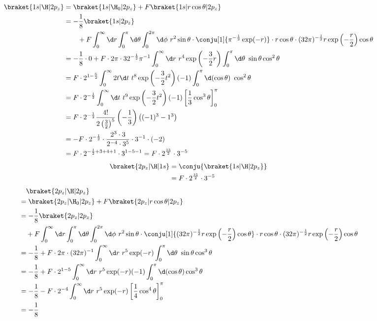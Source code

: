 \begin{align}
	\braket{1s|\H|2p_z}
&=
	\braket{1s|\H_0|2p_z}
	+
	F
		\braket{1s|r\cos\theta|2p_z} \\
%
%
&=
	-
	\frac{1}{8} \braket{1s|2p_z} \nonumber\\&\qquad
	+
	F
		\int_0^\infty \d r  \int_0^\pi \d\theta  \int_0^{2\pi} \d\phi\
			r^2\sin\theta \cdot
			\conju[1]{\pi^{-\frac{1}{2}}\exp(-r)} \cdot
			r\cos\theta \cdot
			(32\pi)^{-\frac{1}{2}} r\exp\left(-\frac{r}{2}\right)\cos\theta \\
%
%
&=
	-
	\frac{1}{8} \cdot 0
	+
	F \cdot 2\pi \cdot 32^{-\frac{1}{2}}\pi^{-1}
		\int_0^\infty \d r\
			r^4 \exp\left(-\frac{3}{2}r\right)
		\int_0^\pi \d\theta\
			\sin\theta\cos^2\theta \\
%
%
&=
	F\cdot 2^{1-\frac{5}{2}}
		\int_0^\infty 2t\d t\
			t^8 \exp\left(-\frac{3}{2}t^2\right)
		(-1)
		\int_0^\pi \d(\cos\theta)\
			\cos^2\theta \\
%
%
&=
	F \cdot 2^{-\frac{1}{2}}
		\int_0^\infty \d t\
			t^9 \exp\left(-\frac{3}{2}t^2\right)
		(-1)
		\left[
			\frac{1}{3}\cos^3\theta
		\right]_0^\pi \\
%
%
&=
	F \cdot 2^{-\frac{1}{2}}
		\frac{
			4!
		}{
			2\left(\frac{3}{2}\right)^{5}
		}
		\left(
			-\frac{1}{3}
		\right)
		\left(
			(-1)^3
			-
			1^3
		\right) \\
%
%
&=
	-
	F \cdot
		2^{-\frac{1}{2}} \cdot
		\frac{
			2^3 \cdot 3
		}{
			2^{-4} \cdot 3^5
		} \cdot
		3^{-1} \cdot
		(-2) \\
%
%
&=
	F \cdot
		2^{-\frac{1}{2}+3+4+1} \cdot
		3^{1-5-1}
%
%
=
	F \cdot
		2^{\frac{15}{2}} \cdot 3^{-5}
\end{align}
\begin{align}
	\braket{2p_z|\H|1s}
&=
	\conju{\braket{1s|\H|2p_z}} \\
%
%
&=
	F \cdot 2^{\frac{15}{2}} \cdot 3^{-5}
\end{align}
\begin{align}
	&\quad
	\braket{2p_z|\H|2p_z} \\
&=
	\braket{2p_z|\H_0|2p_z}
	+
	F
		\braket{2p_z|r\cos\theta|2p_z} \\
%
%
&=
	-
	\frac{1}{8} \braket{2p_z|2p_z} \nonumber\\&\quad
	+
	F
		\int_0^\infty \d r  \int_0^\pi \d\theta  \int_0^{2\pi} \d\phi\
			r^2\sin\theta \cdot
				\conju[1]{
					(32\pi)^{-\frac{1}{2}} r\exp\left(-\frac{r}{2}\right) \cos\theta
				} \cdot
				r\cos\theta \cdot
				(32\pi)^{-\frac{1}{2}} r\exp\left(-\frac{r}{2}\right) \cos\theta \\
%
%
&=
	-
	\frac{1}{8}
	+
	F \cdot 2\pi \cdot (32\pi)^{-1}
		\int_0^\infty \d r\
			r^5 \exp(-r)
		\int_0^\pi \d\theta\
			\sin\theta \cos^3\theta \\
%
%
&=
	-
	\frac{1}{8}
	+
	F \cdot 2^{1-5}
		\int_0^\infty \d r\
			r^5 \exp(-r)
		(-1)
		\int_0^\pi \d(\cos\theta)
			\cos^3\theta \\
%
%
&=
	-
	\frac{1}{8}
	-
	F \cdot 2^{-4}
		\int_0^\infty \d r\
			r^5 \exp(-r)
		\left[
			\frac{1}{4} \cos^4\theta
		\right]_0^\pi \\
%
%
&=
	-
	\frac{1}{8}
\end{align}
